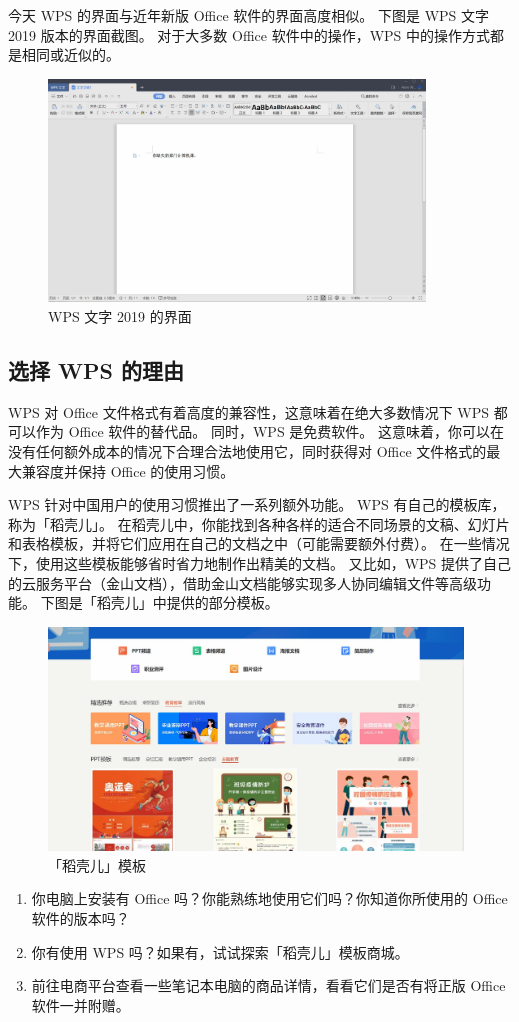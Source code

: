 今天 WPS 的界面与近年新版 Office 软件的界面高度相似。
下图是 WPS 文字 2019 版本的界面截图。
对于大多数 Office 软件中的操作，WPS 中的操作方式都是相同或近似的。

\begin{figure}[htb!]
  \centering
  \includegraphics[width=10cm]{assets/WPS.jpg}
  \caption{WPS 文字 2019 的界面}
  \label{WPS}
\end{figure}

\subsection{选择 WPS 的理由}

WPS 对 Office 文件格式有着高度的兼容性，这意味着在绝大多数情况下 WPS 都可以作为 Office 软件的替代品。
同时，WPS 是免费软件。
这意味着，你可以在没有任何额外成本的情况下合理合法地使用它，同时获得对 Office 文件格式的最大兼容度并保持 Office 的使用习惯。

WPS 针对中国用户的使用习惯推出了一系列额外功能。
WPS 有自己的模板库，称为「稻壳儿」。
在稻壳儿中，你能找到各种各样的适合不同场景的文稿、幻灯片和表格模板，并将它们应用在自己的文档之中（可能需要额外付费）。
在一些情况下，使用这些模板能够省时省力地制作出精美的文档。
又比如，WPS 提供了自己的云服务平台（金山文档），借助金山文档能够实现多人协同编辑文件等高级功能。
下图是「稻壳儿」中提供的部分模板。

\begin{figure}[htb!]
  \centering
  \includegraphics[width=11cm]{assets/WPS_Template.jpg}
  \caption{「稻壳儿」模板}
  \label{WPS_Template}
\end{figure}

\practice

\begin{enumerate}
  \item 你电脑上安装有 Office 吗？你能熟练地使用它们吗？你知道你所使用的 Office 软件的版本吗？
  \item 你有使用 WPS 吗？如果有，试试探索「稻壳儿」模板商城。
  \item 前往电商平台查看一些笔记本电脑的商品详情，看看它们是否有将正版 Office 软件一并附赠。
\end{enumerate}